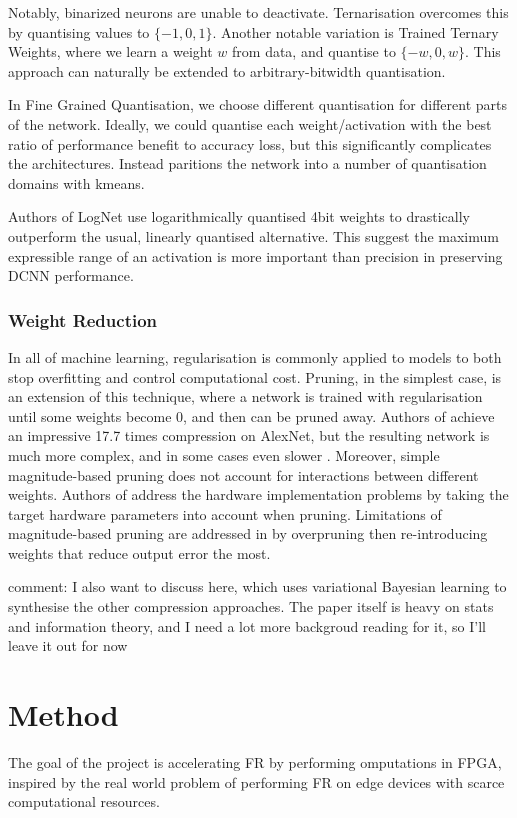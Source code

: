 \documentclass[12pt]{article}
\begin{document}
Notably, binarized neurons are unable to deactivate. Ternarisation overcomes this by quantising
values to $\{-1, 0, 1\}$.
Another notable variation is Trained Ternary Weights, where we learn a weight $w$ from data,
and quantise to $\{-w, 0 ,w\}$.
This approach can naturally be extended to arbitrary-bitwidth quantisation.

In Fine Grained Quantisation, we choose different quantisation for different parts of the network.
Ideally, we could quantise each weight/activation with the best ratio of performance benefit
to accuracy loss,
but this significantly complicates the architectures.
Instead \cite{wu2016quantized} paritions the network into a number of quantisation domains
with kmeans.

Authors of LogNet\cite{lee2017lognet} use logarithmically quantised 4bit weights to drastically
outperform the usual, linearly quantised alternative.
This suggest the maximum expressible range of an activation is more important than precision
in preserving DCNN performance.

\subsubsection{Weight Reduction}
In all of machine learning, regularisation is commonly applied to models to both stop overfitting
and control computational cost.
Pruning, in the simplest case, is an extension of this technique, where a network is trained
with regularisation until some weights become 0, and then can be pruned away.
Authors of \cite{guo2016dynamic} achieve an impressive 17.7 times compression on AlexNet,
but the resulting network is much more complex, and in some cases even slower \cite{yu2017scalpel}.
Moreover, simple magnitude-based pruning does not account for interactions between different
weights.
Authors of \cite{yu2017scalpel} address the hardware implementation problems by taking the
target hardware parameters into account when pruning.
Limitations of magnitude-based pruning are addressed in \cite{yang2017designing} by overpruning
then re-introducing weights that reduce output error the most.

comment: I also want to discuss \cite{ullrich2017soft} here, which uses variational Bayesian learning
to synthesise the other compression approaches.
The paper itself is heavy on stats and information theory, and I need a lot more backgroud
reading for it, so I'll leave it out for now 

\section{Method}
The goal of the project is accelerating FR by performing omputations in FPGA,
inspired by the real world problem of performing FR on edge devices with scarce computational
resources.
\end{document}
